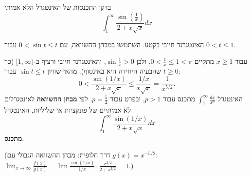 
\begin{question}
בדקו התכנסות של האינטגרל הלא אמיתי
\[ \int_1^\infty\frac{\sin(\frac1x)}{2+x\sqrt{x}}dx \]
\end{question}

\begin{hint}
האינטגרנד חיובי בקטע. השתמשו במבחן ההשוואה, עם $0<\sin t\le t$ עבור $0<t\le1$.
\end{hint}

\begin{solution}
עבור $x\ge1$ מתקיים $0<\frac1x\le1<\pi$, ולכן $\sin\frac1x>0$, והאינטגרנד חיובי ורציף ב-$[1,\infty)$ (כך שהבעיה היחידה היא באינסוף). מהאי-שוויון $\sin t\le t$ עבור $t\ge0$:
\[ 0<\frac{\sin(1/x)}{2+x\sqrt x}\le\frac{1/x}{x\sqrt x}=\frac{1}{x^{5/2}}. \]
האינטגרל $\int_1^\infty\frac{dx}{x^{p}}$ מתכנס עבור $p>1$, ובפרט עבור $p=\frac52$. לפי \textbf{מבחן ההשוואה} לאינטגרלים לא אמיתיים של פונקציות אי-שליליות, האינטגרל
\[ \int_1^\infty\frac{\sin(1/x)}{2+x\sqrt x}dx \]
\textbf{מתכנס}.

(דרך חלופית: מבחן ההשוואה הגבולי עם $g(x)=x^{-5/2}$: $\lim_{x\to\infty}\frac{f(x)}{g(x)}=\lim\frac{\sin(1/x)}{1/x}\cdot\frac{x^{3/2}}{2+x^{3/2}}=1$.)
\end{solution}

